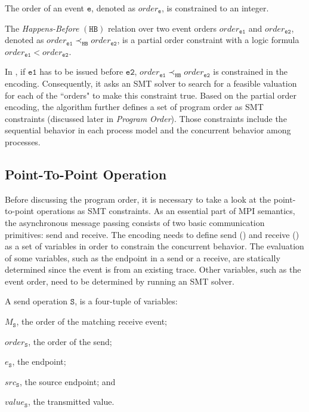 \begin{definition}[Order]\label{def:order}
The order of an event $\mathtt{e}$, denoted as $\mathit{order}_\mathtt{e}$, is constrained to an integer.
\end{definition}

\begin{definition}\label{def:happens-before}
The \emph{Happens-Before} $(\mathtt{HB})$ relation over two event orders $\mathit{order}_\mathtt{e1}$ and $\mathit{order}_\mathtt{e2}$, denoted as
$\mathit{order}_\mathtt{e1} \mathrm{\prec_\mathtt{HB}} \mathit{order}_\mathtt{e2}$, is a partial order constraint with a logic formula $\mathit{order}_\mathtt{e1} <  \mathit{order}_\mathtt{e2}$. 
\label{def:hb}
\end{definition}

In , if $\mathtt{e1}$ has to be issued before $\mathtt{e2}$, $\mathit{order}_\mathtt{e1} \mathrm{\prec_\mathtt{HB}} \mathit{order}_\mathtt{e2}$ is constrained in the encoding. Consequently, it asks an SMT solver to search for a feasible valuation for each of the ``orders" to make this constraint true. Based on the partial order encoding, the algorithm further defines a set of program order as SMT constraints (discussed later in \emph{Program Order}). Those constraints include the sequential behavior in each process model and the concurrent behavior among processes. 

\subsection{Point-To-Point Operation}
Before discussing the program order, it is necessary to take a look at the point-to-point operations as SMT constraints. As an essential part of MPI semantics, the asynchronous message passing consists of two basic communication primitives: send and receive. The encoding needs to define send () and receive () as a set of variables in order to constrain the concurrent behavior. The evaluation of some variables, such as the endpoint in a send or a receive, are statically determined since the event is from an existing trace. Other variables, such as the event order, need to be determined by running an SMT solver. 
 
\begin{definition}[Send] \label{def:snd}
A send operation $\mathtt{S}$, is a four-tuple of variables:
\begin{compactenum}
\item $M_\mathtt{S}$, the order of the matching receive event;
\item $\mathit{order}_\mathtt{S}$, the order of the send;
\item $e_\mathtt{S}$, the endpoint; 
\item $src_\mathtt{S}$, the source endpoint; and
\item $\mathit{value}_\mathtt{S}$, the transmitted value.
\end{compactenum}
\end{definition}

